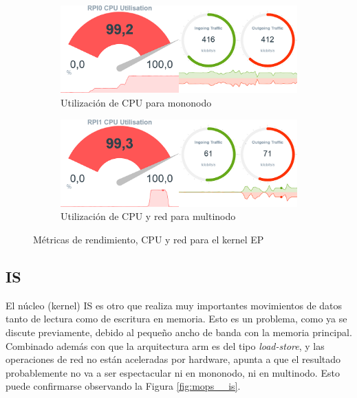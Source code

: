 \begin{figure}[h!]
    \begin{subfigure}[c]{0.75\textwidth}
        \includegraphics[width=\textwidth]{img/benchmark_rev/ep_rev_sn.png}
        \caption{Utilización de CPU para mononodo}
        \label{fig:mops_rev_sn__ep}
    \end{subfigure}

    \vspace{0.5cm}
    
    \begin{subfigure}[c]{0.75\textwidth}
        \includegraphics[width=\textwidth]{img/benchmark_rev/ep_rev_mn.png}
        \caption{Utilización de CPU y red para multinodo}
        \label{fig:mops_rev_mn__ep}
    \end{subfigure}
    \caption{Métricas de rendimiento, CPU y red para el kernel EP}
    \label{fig:mops__ep}
\end{figure}

\subsection{IS}
\label{ssec:comparacion_resultados__is}
El núcleo (kernel) IS es otro que realiza muy importantes movimientos de datos tanto de lectura como de escritura en memoria. Esto es un problema, como ya se discute previamente, debido al pequeño ancho de banda con la memoria principal. Combinado además con que la arquitectura \acrshort{arm} es del tipo \textit{load-store}, y las operaciones de red no están aceleradas por hardware, apunta a que el resultado probablemente no va a ser espectacular ni en mononodo, ni en multinodo. Esto puede confirmarse observando la Figura \ref{fig:mops__is}.

